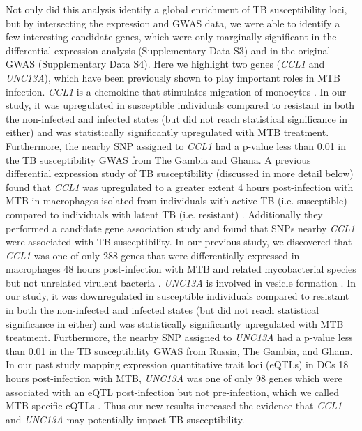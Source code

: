 \documentclass[fleqn,10pt]{wlscirep}
\begin{document}
Not only did this analysis identify a global enrichment of TB
susceptibility loci, but by intersecting the expression and GWAS data,
we were able to identify a few interesting candidate genes, which were
only marginally significant in the differential expression analysis
(Supplementary Data S3) and in the original GWAS (Supplementary Data
S4). Here we highlight two genes (\emph{CCL1} and \emph{UNC13A}),
which have been previously shown to play important roles in MTB
infection. \emph{CCL1} is a chemokine that stimulates migration of
monocytes \cite{Miller1992}. In our study, it was upregulated in
susceptible individuals compared to resistant in both the non-infected
and infected states (but did not reach statistical significance in
either) and was statistically significantly upregulated with MTB
treatment. Furthermore, the nearby SNP assigned to \emph{CCL1} had a
p-value less than 0.01 in the TB susceptibility GWAS from The Gambia
and Ghana. A previous differential expression study of TB
susceptibility (discussed in more detail below) found that \emph{CCL1}
was upregulated to a greater extent 4 hours post-infection with MTB in
macrophages isolated from individuals with active TB (i.e.
susceptible) compared to individuals with latent TB (i.e. resistant)
\cite{Thuong2008}. Additionally they performed a candidate gene
association study and found that SNPs nearby \emph{CCL1} were
associated with TB susceptibility. In our previous study, we
discovered that \emph{CCL1} was one of only 288 genes that were
differentially expressed in macrophages 48 hours post-infection with
MTB and related mycobacterial species but not unrelated virulent
bacteria \cite{Blischak2015}. \emph{UNC13A} is involved in vesicle
formation \cite{Sudhof2004}. In our study, it was downregulated in
susceptible individuals compared to resistant in both the non-infected
and infected states (but did not reach statistical significance in
either) and was statistically significantly upregulated with MTB
treatment. Furthermore, the nearby SNP assigned to \emph{UNC13A} had a
p-value less than 0.01 in the TB susceptibility GWAS from Russia, The
Gambia, and Ghana. In our past study mapping expression quantitative
trait loci (eQTLs) in DCs 18 hours post-infection with MTB,
\emph{UNC13A} was one of only 98 genes which were associated with an
eQTL post-infection but not pre-infection, which we called
MTB-specific eQTLs \cite{Barreiro2012}. Thus our new results increased
the evidence that \emph{CCL1} and \emph{UNC13A} may potentially impact
TB susceptibility.
\end{document}

